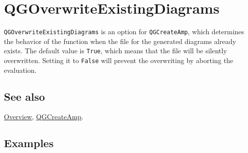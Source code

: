 \documentclass[../FeynHelpersManual.tex]{subfiles}
\begin{document}
\hypertarget{qgoverwriteexistingdiagrams}{
\section{QGOverwriteExistingDiagrams}\label{qgoverwriteexistingdiagrams}}

\texttt{QGOverwriteExistingDiagrams} is an option for
\texttt{QGCreateAmp}, which determines the behavior of the function when
the file for the generated diagrams already exists. The default value is
\texttt{True}, which means that the file will be silently overwritten.
Setting it to \texttt{False} will prevent the overwriting by aborting
the evaluation.

\subsection{See also}

\hyperlink{toc}{Overview}, \hyperlink{qgcreateamp}{QGCreateAmp}.

\subsection{Examples}
\end{document}
